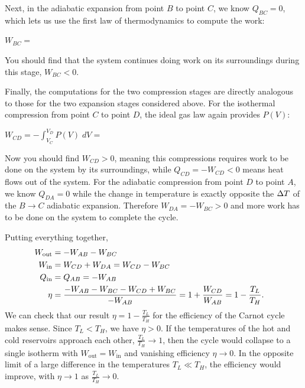 Next, in the adiabatic expansion from point $B$ to point $C$, we know $Q_{BC} = 0$, which lets us use the first law of thermodynamics to compute the work:
\begin{mdframed}
  $\displaystyle W_{BC} = $ \\[50 pt]
\end{mdframed}
You should find that the system continues doing work on its surroundings during this stage, $W_{BC} < 0$.

Finally, the computations for the two compression stages are directly analogous to those for the two expansion stages considered above.
For the isothermal compression from point $C$ to point $D$, the ideal gas law again provides $P(V)$:
\begin{mdframed}
  $\displaystyle W_{CD} = -\int_{V_C}^{V_D} P(V) \; dV = $ \\[50 pt]
\end{mdframed}
Now you should find $W_{CD} > 0$, meaning this compressions requires work to be done on the system by its surroundings, while $Q_{CD} = -W_{CD} < 0$ means heat flows out of the system.
For the adiabatic compression from point $D$ to point $A$, we know $Q_{DA} = 0$ while the change in temperature is exactly opposite the $\Delta T$ of the $B \to C$ adiabatic expansion.
Therefore $W_{DA} = -W_{BC} > 0$ and more work has to be done on the system to complete the cycle.

Putting everything together,
\begin{align}
  W_{\text{out}} & = -W_{AB} - W_{BC} \cr
  W_{\text{in}} & = W_{CD} + W_{DA} = W_{CD} - W_{BC} \cr
  Q_{\text{in}} & = Q_{AB} = -W_{AB} \cr
  \eta & = \frac{-W_{AB} - W_{BC} - W_{CD} + W_{BC}}{-W_{AB}} = 1 + \frac{W_{CD}}{W_{AB}} = 1 - \frac{T_L}{T_H}.
\end{align}
We can check that our result $\eta = 1 - \frac{T_L}{T_H}$ for the efficiency of the Carnot cycle makes sense.
Since $T_L < T_H$, we have $\eta > 0$.
If the temperatures of the hot and cold reservoirs approach each other, $\frac{T_L}{T_H} \to 1$, then the cycle would collapse to a single isotherm with $W_{\text{out}} = W_{\text{in}}$ and vanishing efficiency $\eta \to 0$.
In the opposite limit of a large difference in the temperatures $T_L \ll T_H$, the efficiency would improve, with $\eta \to 1$ as $\frac{T_L}{T_H} \to 0$.

